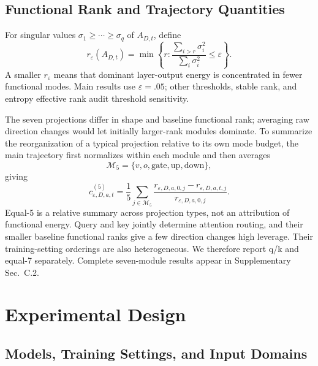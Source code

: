\documentclass[letterpaper]{article} %
\begin{document}
\subsection{Functional Rank and Trajectory Quantities}

For singular values $\sigma_1\ge\cdots\ge\sigma_q$ of $A_{D,t}$, define
\begin{equation}
r_\varepsilon(A_{D,t})
=\min\left\{r:
\frac{\sum_{i>r}\sigma_i^2}{\sum_i\sigma_i^2}\le\varepsilon
\right\}.
\label{eq:functional-rank}
\end{equation}
A smaller $r_\varepsilon$ means that dominant layer-output energy is concentrated in fewer functional modes. Main results use $\varepsilon=.05$; other thresholds, stable rank, and entropy effective rank audit threshold sensitivity.

The seven projections differ in shape and baseline functional rank; averaging raw
direction changes would let initially larger-rank modules dominate. To summarize the
reorganization of a typical projection relative to its own mode budget, the main
trajectory first normalizes within each module and then averages
\begin{equation}
\mathcal M_5=\{v,o,\mathrm{gate},\mathrm{up},\mathrm{down}\},
\end{equation}
giving
\begin{equation}
c_{\varepsilon,D,a,t}^{(5)}
=\frac{1}{5}\sum_{j\in\mathcal M_5}
\frac{r_{\varepsilon,D,a,0,j}-r_{\varepsilon,D,a,t,j}}
{r_{\varepsilon,D,a,0,j}}.
\label{eq:relative-contraction}
\end{equation}
Equal-5 is a relative summary across projection types, not an attribution of functional
energy. Query and key jointly determine attention routing, and their smaller baseline
functional ranks give a few direction changes high leverage. Their training-setting
orderings are also heterogeneous. We therefore report q/k and equal-7 separately.
Complete seven-module results appear in Supplementary Sec.~C.2.

\section{Experimental Design}

\subsection{Models, Training Settings, and Input Domains}
\end{document}
